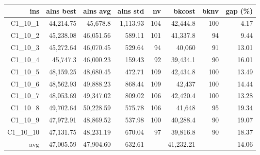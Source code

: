   \begin{table}[caption={Kết quả đo với tập HG\_C\_1\_10 1000 yêu cầu}, label=exp:HGC110]
    \small
    \centering
    \begin{tabular}{rrrrrrrr}
    \hline
    ins & alns best & alns avg & alns std & nv & bkcost & bknv & gap (\%) \\ \hline
    C1\_10\_1 & 44,214.75 & 45,678.8 & 1,113.93 & 104 & 42,444.8 & 100 & 4.17 \\ \hline
    C1\_10\_2 & 45,238.08 & 46,051.56 & 589.11 & 101 & 41,337.8 & 94 & 9.44 \\ \hline
    C1\_10\_3 & 45,272.64 & 46,070.45 & 529.64 & 94 & 40,060 & 91 & 13.01 \\ \hline
    C1\_10\_4 & 45,747.3 & 46,000.23 & 159.43 & 92 & 39,434.1 & 90 & 16.01 \\ \hline
    C1\_10\_5 & 48,159.25 & 48,680.45 & 472.71 & 109 & 42,434.8 & 100 & 13.49 \\ \hline
    C1\_10\_6 & 48,562.93 & 49,888.23 & 868.44 & 109 & 42,437 & 100 & 14.44 \\ \hline
    C1\_10\_7 & 48,053.69 & 49,347.02 & 809.02 & 106 & 42,420.4 & 100 & 13.28 \\ \hline
    C1\_10\_8 & 49,702.64 & 50,228.59 & 575.78 & 106 & 41,648 & 95 & 19.34 \\ \hline
    C1\_10\_9 & 47,972.91 & 48,869.52 & 537.98 & 100 & 40,288.4 & 90 & 19.07 \\ \hline
    C1\_10\_10 & 47,131.75 & 48,231.19 & 670.04 & 97 & 39,816.8 & 90 & 18.37 \\ \hline
    avg & 47,005.59 & 47,904.60 & 632.61 & & 41,232.21 & & 14.06 \\ \hline
    \end{tabular}
  \end{table}


